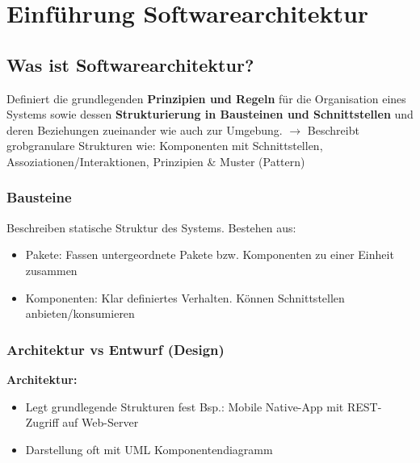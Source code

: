 

\section{Einführung Softwarearchitektur}
\subsection{Was ist Softwarearchitektur?}
Definiert die grundlegenden \textbf{Prinzipien und Regeln} für die Organisation eines Systems sowie dessen \textbf{Strukturierung in Bausteinen und Schnittstellen} und deren Beziehungen zueinander wie auch zur Umgebung. $\rightarrow$ Beschreibt grobgranulare Strukturen wie: Komponenten mit Schnittstellen, Assoziationen/Interaktionen, Prinzipien \& Muster (Pattern)

\subsubsection{Bausteine}
Beschreiben statische Struktur des Systems. Bestehen aus:
\begin{itemize}[topsep=0pt, leftmargin=3mm]
    \setlength\itemsep{-0.3em}
    \item Pakete: Fassen untergeordnete Pakete bzw. Komponenten zu einer Einheit zusammen
    \item Komponenten: Klar definiertes Verhalten. Können Schnittstellen anbieten/konsumieren
\end{itemize}

\subsubsection{Architektur vs Entwurf (Design)}
\textbf{Architektur:}
\begin{itemize}[topsep=0pt, leftmargin=3mm]
    \setlength\itemsep{-0.3em}
    \item Legt grundlegende Strukturen fest
    \SubItem Bsp.: Mobile Native-App mit REST-Zugriff auf Web-Server
    \item Darstellung oft mit UML Komponentendiagramm
\end{itemize}

